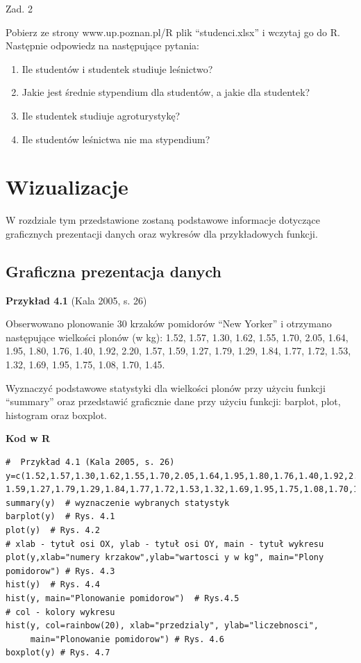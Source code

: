 \documentclass[12pt,B5paper,]{book}
\begin{document}
\vspace{0.8cm} Zad. 2

Pobierz ze strony www.up.poznan.pl/R plik ``studenci.xlsx'' i wczytaj go
do R. Następnie odpowiedz na następujące pytania:

\begin{enumerate}
\def\labelenumi{\alph{enumi})}
\item
  Ile studentów i studentek studiuje leśnictwo?
\item
  Jakie jest średnie stypendium dla studentów, a jakie dla studentek?
\item
  Ile studentek studiuje agroturystykę?
\item
  Ile studentów leśnictwa nie ma stypendium?
\end{enumerate}

\chapter{Wizualizacje}\label{wizualizacje}

W rozdziale tym przedstawione zostaną podstawowe informacje dotyczące
graficznych prezentacji danych oraz wykresów dla przykładowych funkcji.

\section{Graficzna prezentacja
danych}\label{graficzna-prezentacja-danych}

\vspace{0.8cm} \textbf{Przykład 4.1} (Kala 2005, s. 26)

Obserwowano plonowanie 30 krzaków pomidorów ``New Yorker'' i otrzymano
następujące wielkości plonów (w kg): 1.52, 1.57, 1.30, 1.62, 1.55, 1.70,
2.05, 1.64, 1.95, 1.80, 1.76, 1.40, 1.92, 2.20, 1.57, 1.59, 1.27, 1.79,
1.29, 1.84, 1.77, 1.72, 1.53, 1.32, 1.69, 1.95, 1.75, 1.08, 1.70, 1.45.

Wyznaczyć podstawowe statystyki dla wielkości plonów przy użyciu funkcji
``summary'' oraz przedstawić graficznie dane przy użyciu funkcji:
barplot, plot, histogram oraz boxplot.

\vspace{0.8cm} \textbf{Kod w R}

\begin{verbatim}
#  Przykład 4.1 (Kala 2005, s. 26)
y=c(1.52,1.57,1.30,1.62,1.55,1.70,2.05,1.64,1.95,1.80,1.76,1.40,1.92,2.20,1.57,
1.59,1.27,1.79,1.29,1.84,1.77,1.72,1.53,1.32,1.69,1.95,1.75,1.08,1.70,1.45)
summary(y)  # wyznaczenie wybranych statystyk
barplot(y)  # Rys. 4.1
plot(y)  # Rys. 4.2
# xlab - tytuł osi OX, ylab - tytuł osi OY, main - tytuł wykresu
plot(y,xlab="numery krzakow",ylab="wartosci y w kg", main="Plony pomidorow") # Rys. 4.3
hist(y)  # Rys. 4.4
hist(y, main="Plonowanie pomidorow")  # Rys.4.5
# col - kolory wykresu
hist(y, col=rainbow(20), xlab="przedzialy", ylab="liczebnosci",
     main="Plonowanie pomidorow") # Rys. 4.6
boxplot(y) # Rys. 4.7
\end{verbatim}
\end{document}
